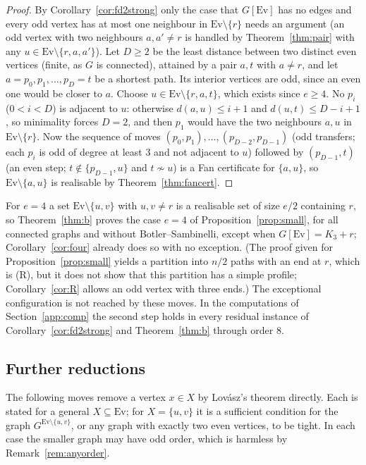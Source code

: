 \documentclass[11pt]{amsart}
\theoremstyle{definition}
\newcommand{\Ev}{\mathrm{Ev}}
\begin{document}
\begin{proof}
By Corollary~\ref{cor:fd2strong} only the case that $G[\Ev]$ has no edges and every odd vertex has
at most one neighbour in $\Ev\setminus\{r\}$ needs an argument (an odd vertex with two neighbours
$a,a'\ne r$ is handled by Theorem~\ref{thm:pair} with any $u\in\Ev\setminus\{r,a,a'\}$). Let $D\ge2$
be the least distance between two distinct even vertices (finite, as $G$ is connected), attained by
a pair $a,t$ with $a\ne r$, and let $a=p_0,p_1,\dots,p_D=t$ be a shortest path. Its interior vertices
are odd, since an even one would be closer to $a$. Choose
$u\in\Ev\setminus\{r,a,t\}$, which exists since $e\ge4$. No $p_i$ ($0<i<D$) is adjacent to $u$:
otherwise $d(a,u)\le i+1$ and $d(u,t)\le D-i+1$, so minimality forces $D=2$, and then $p_1$ would
have the two neighbours $a,u$ in $\Ev\setminus\{r\}$. Now the sequence of moves
$(p_0,p_1),\dots,(p_{D-2},p_{D-1})$ (odd transfers; each $p_i$ is odd of degree at least $3$ and
not adjacent to $u$) followed by $(p_{D-1},t)$ (an even step; $t\notin\{p_{D-1},u\}$ and $t\not\sim
u$) is a Fan certificate for $\{a,u\}$, so $\Ev\setminus\{a,u\}$ is realisable by
Theorem~\ref{thm:fancert}.
\end{proof}

For $e=4$ a set $\Ev\setminus\{u,v\}$ with $u,v\ne r$ is a realisable set of size $e/2$ containing $r$,
so Theorem~\ref{thm:b} proves the case $e=4$ of Proposition~\ref{prop:small}, for all connected
graphs and without Botler--Sambinelli, except when $G[\Ev]=K_3+r$; Corollary~\ref{cor:four}
already does so with no exception. (The proof given for
Proposition~\ref{prop:small} yields a partition into $n/2$ paths with an end at $r$, which is (R),
but it does not show that this partition has a simple profile; Corollary~\ref{cor:R} allows an odd
vertex with three ends.) The exceptional configuration is not reached by these moves. In
the computations of Section~\ref{app:comp} the second step holds in every residual instance of
Corollary~\ref{cor:fd2strong} and Theorem~\ref{thm:b} through order $8$.


\subsection{Further reductions}

The following moves remove a vertex $x\in X$ by Lov\'asz's theorem directly. Each is stated for a
general $X\subseteq\Ev$; for $X=\{u,v\}$ it is a sufficient condition for the graph
$G^{\Ev\setminus\{u,v\}}$, or any graph with exactly two even vertices, to be tight. In each case
the smaller graph may have odd order, which is harmless by Remark~\ref{rem:anyorder}.
\end{document}
